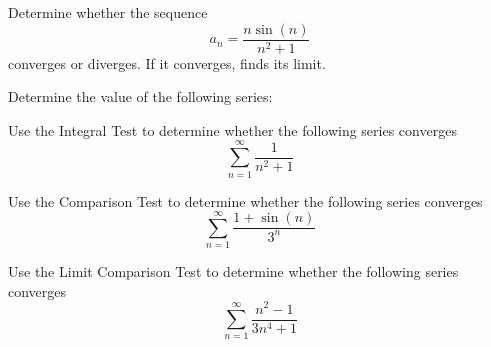 \documentclass[11pt]{exam}
\begin{document}
%
%
%

\begin{questions}



\addpoints
\question[2] Determine whether the sequence 
\begin{equation*}
a_n = \frac{n\sin(n)}{n^2+1}
\end{equation*}
converges or diverges. If it converges, finds its limit. 


\newpage
\addpoints
\question Determine the value of the following series: 

\newpage
\addpoints
\question[2] Use the Integral Test to determine whether the following series converges
\begin{equation*}
\sum_{n=1}^{\infty} \frac{1}{n^2+1}
\end{equation*}

\newpage
\addpoints
\question[2] Use the Comparison Test to determine whether the following series converges
\begin{equation*}
\sum_{n=1}^{\infty} \frac{1+\sin(n)}{3^n}
\end{equation*}

\newpage
\addpoints
\question[2] Use the Limit Comparison Test to determine whether the following series converges
\begin{equation*}
\sum_{n=1}^{\infty} \frac{n^2-1}{3n^4+1}
\end{equation*}


\end{questions}
\end{document}
